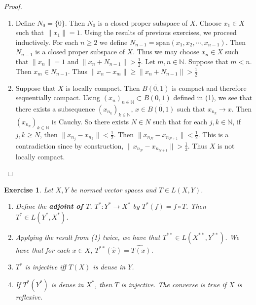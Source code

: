 \documentclass[12pt]{amsart}
\newtheorem{ex}[thm]{Exercise}
\newcommand{\N}{\mathbb{N}}
\newcommand{\conv}[1]{\xrightarrow{#1}}
\begin{document}
	\begin{proof}
		\begin{enumerate}
			\item Define $N_0 = \{0\}$. Then $N_0$ is a closed proper subspace of $X$. Choose $x_1 \in X$ such that $\|x_1 \|= 1$. Using the results of previous exercises, we proceed inductively. For each $n \geq 2$ we define $N_{n-1} = \text{span}(x_1, x_2, \cdots, x_{n-1})$. Then $N_{n-1}$ is a closed proper subspace of $X$. Thus we may choose $x_n \in X$ such that $\|x_n \|= 1$ and $\|x_n + N_{n-1} \|>  \frac{1}{2}$. Let $m,n \in \N$. Suppose that $m<n$. Then $x_m \in N_{n-1}$. Thus $\|x_n - x_m \|\geq \|x_n + N_{n-1} \|> \frac{1}{2}$\vspace{.5cm}\\
			\item Suppose that $X$ is locally compact. Then $\overline{B(0,1)}$ is compact and therefore sequentially compact. Using $(x_n)_{n \in \N} \subset \overline{B(0,1)}$ defined in (1), we see that there exists a subsequence $(x_{n_k})_{k \in \N}$, $x \in \overline{B(0,1)}$ such that $x_{n_k} \conv{} x$. Then $(x_{n_k})_{k \in \N}$ is Cauchy. So there exists $N \in N$ such that for each $j, k \in \N$, if $j, k \geq N$, then $\|x_{n_j} - x_{n_k} \|< \frac{1}{2}$. Then $\|x_{n_N} - x_{n_{N+1}} \| < \frac{1}{2}$. This is a contradiction since by construction, $\|x_{n_N} - x_{n_{N+1}} \| > \frac{1}{2}$. Thus $X$ is not locally compact.
		\end{enumerate}
	\end{proof}
	
	\begin{ex}
		Let $X,Y$ be normed vector spaces and $T \in L(X,Y)$. 
		\begin{enumerate}
			\item Define the \textbf{adjoint of $T$}, $T^*:Y^* \rightarrow X^*$ by $T^*(f) = f \circ T$. Then $T^* \in L(Y^*, X^*)$.
			\item Applying the result from (1) twice, we have that $T^{**} \in L(X^{**},Y^{**})$. We have that for each $x \in X$, $T^{**}(\hat{x}) = \widehat{T(x)}$.
			\item $T^*$ is injective iff $T(X)$ is dense in $Y$.
			\item If $T^*(Y^*)$ is dense in $X^*$, then $T$ is injective. The converse is true if $X$ is reflexive.
		\end{enumerate}
	\end{ex}
	
\end{document}
